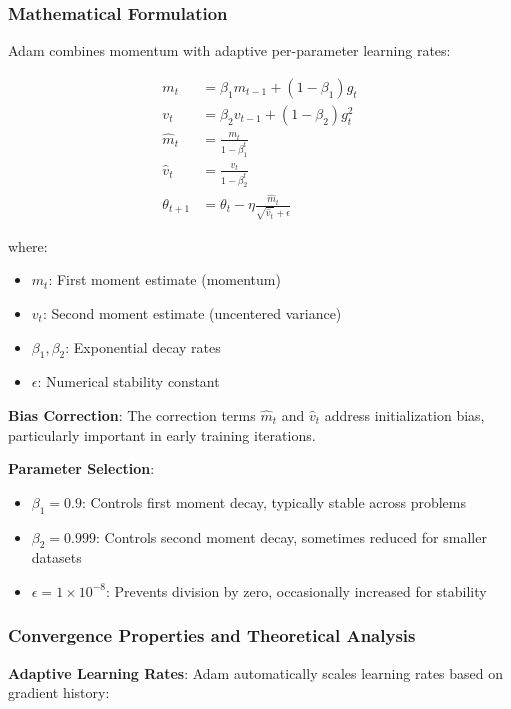 \documentclass[11pt,a4paper]{report}
\begin{document}
\subsubsection{Mathematical Formulation}

Adam combines momentum with adaptive per-parameter learning rates:

\begin{align}
m_t &= \beta_1 m_{t-1} + (1 - \beta_1) g_t \\
v_t &= \beta_2 v_{t-1} + (1 - \beta_2) g_t^2 \\
\hat{m}_t &= \frac{m_t}{1 - \beta_1^t} \\
\hat{v}_t &= \frac{v_t}{1 - \beta_2^t} \\
\theta_{t+1} &= \theta_t - \eta \frac{\hat{m}_t}{\sqrt{\hat{v}_t} + \epsilon}
\end{align}

where:
\begin{itemize}
\item $m_t$: First moment estimate (momentum)
\item $v_t$: Second moment estimate (uncentered variance)
\item $\beta_1, \beta_2$: Exponential decay rates
\item $\epsilon$: Numerical stability constant
\end{itemize}

\textbf{Bias Correction}: The correction terms $\hat{m}_t$ and $\hat{v}_t$ address initialization bias, particularly important in early training iterations.

\textbf{Parameter Selection}:
\begin{itemize}
\item $\beta_1 = 0.9$: Controls first moment decay, typically stable across problems
\item $\beta_2 = 0.999$: Controls second moment decay, sometimes reduced for smaller datasets
\item $\epsilon = 1 \times 10^{-8}$: Prevents division by zero, occasionally increased for stability
\end{itemize}

\subsubsection{Convergence Properties and Theoretical Analysis}

\textbf{Adaptive Learning Rates}: Adam automatically scales learning rates based on gradient history:
\end{document}
